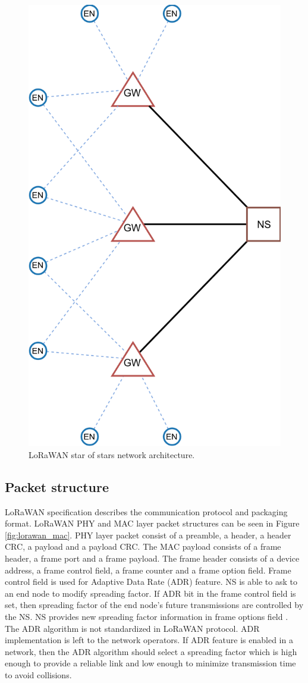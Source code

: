 \begin{figure}
\centering
\includegraphics[width=.7\linewidth]{fig/lorawan_topology.png}
\vspace*{4mm}
\caption{LoRaWAN star of stars network architecture.}
\label{fig:lorawan_topology}
\end{figure}

\subsection{Packet structure}
LoRaWAN specification describes the communication protocol and packaging format. LoRaWAN PHY and MAC layer packet structures can be seen in Figure \ref{fig:lorawan_mac}. PHY layer packet consist of a preamble, a header, a header CRC, a payload and a payload CRC. The MAC payload consists of a frame header, a frame port and a frame payload. The frame header consists of a device address, a frame control field, a frame counter and a frame option field. Frame control field is used for Adaptive Data Rate (ADR) feature. NS is able to ask to an end node to modify spreading factor. If ADR bit in the frame control field is set, then spreading factor of the end node's future transmissions are controlled by the NS. NS provides new spreading factor information in frame options field \cite{lorawan.specification}. The ADR algorithm is not standardized in LoRaWAN protocol. ADR implementation is left to the network operators. If ADR feature is enabled in a network, then the ADR algorithm should select a spreading factor which is high enough to provide a reliable link and low enough to minimize transmission time to avoid collisions.

